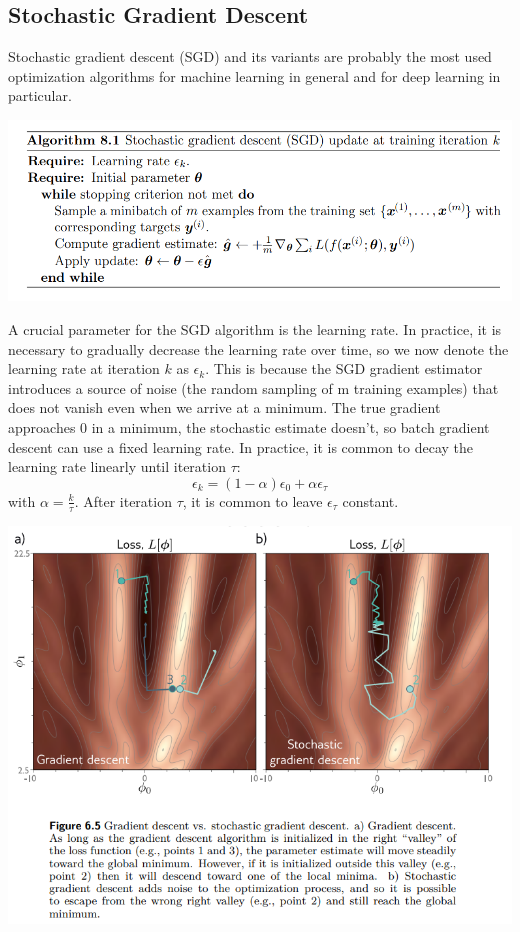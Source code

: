 \subsection{Stochastic Gradient Descent}
Stochastic gradient descent (SGD) and its variants are probably the most used optimization algorithms for machine learning in general and for deep learning in particular.
\begin{center}
    \includegraphics[scale=0.8]{images/SGD.png}
\end{center}
A crucial parameter for the SGD algorithm is the learning rate. In practice, it is necessary to gradually decrease the learning rate over time, so we now denote the learning rate at iteration $k$ as $\epsilon_k$. This is because the SGD gradient estimator introduces a source of noise (the random sampling of m training examples) that does not vanish even when we arrive at a minimum. The true gradient approaches 0 in a minimum, the stochastic estimate doesn’t, so batch gradient descent can use a fixed learning rate. In practice, it is common to decay the learning rate linearly until iteration $\tau$:
\[\epsilon_k = (1 - \alpha)\epsilon_0 + \alpha \epsilon_\tau\]
with $\alpha = \frac{k}{\tau}$. After iteration $\tau$, it is common to leave $\epsilon_\tau$ constant.  
\begin{center}
    \includegraphics[scale=0.8]{images/SGD vs BGD.png}
\end{center}


